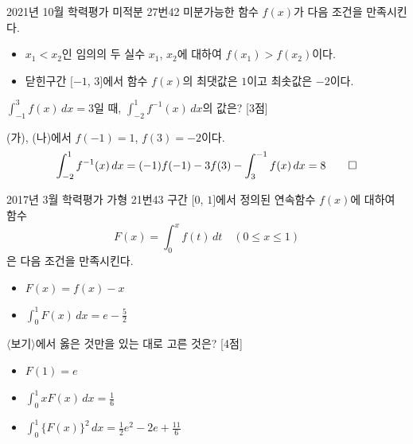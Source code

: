 \documentclass{article}
\begin{document}
\newpage
\begin{prob}{2021년 10월 학력평가 미적분 27번}{42}
	미분가능한 함수 $f(x)$가 다음 조건을 만족시킨다.
	\begin{hint}
		\begin{itemize}
			\item[(가)] $x_1<x_2$인 임의의 두 실수 $x_1$, $x_2$에 대하여 $f(x_1)>f(x_2)$이다.
			\item[(나)] 닫힌구간 $[-1$, $3]$에서 함수 $f(x)$의 최댓값은 $1$이고 최솟값은 $-2$이다.
		\end{itemize}
	\end{hint}
	$\displaystyle\int_{-1}^3f(x)\,dx=3$일 때, $\displaystyle\int_{-2}^1f^{-1}(x)\,dx$의 값은? [3점]
\end{prob}

\begin{sol}
	(가), (나)에서 $f(-1)=1$, $f(3)=-2$이다.
	\[
		\int_{-2}^1f^{-1}(x)\,dx=(-1)f(-1)-3f(3)-\int_3^{-1}f(x)\,dx=8\qed
	\]
\end{sol}

\newpage
\begin{prob}{2017년 3월 학력평가 가형 21번}{43}
	구간 $[0$, $1]$에서 정의된 연속함수 $f(x)$에 대하여 함수
	\[
		F(x)=\int_0^xf(t)\,dt\quad(0\leq x\leq 1)
	\]
	은 다음 조건을 만족시킨다.
	\begin{hint}
		\begin{itemize}
			\item[(가)] $F(x)=f(x)-x$
			\item[(나)] $\displaystyle\int_0^1F(x)\,dx=e-\frac{5}{2}$
		\end{itemize}
	\end{hint}
	$\langle$보기$\rangle$에서 옳은 것만을 있는 대로 고른 것은? [4점]
	\begin{hint}[보기]
		\begin{itemize}
			\item[ㄱ.] $F(1)=e$
			\item[ㄴ.] $\displaystyle\int_0^1xF(x)\,dx=\frac{1}{6}$
			\item[ㄷ.] $\displaystyle\int_0^1\{F(x)\}^2\,dx=\frac{1}{2}e^2-2e+\frac{11}{6}$
		\end{itemize}
	\end{hint}
\end{prob}
\end{document}
